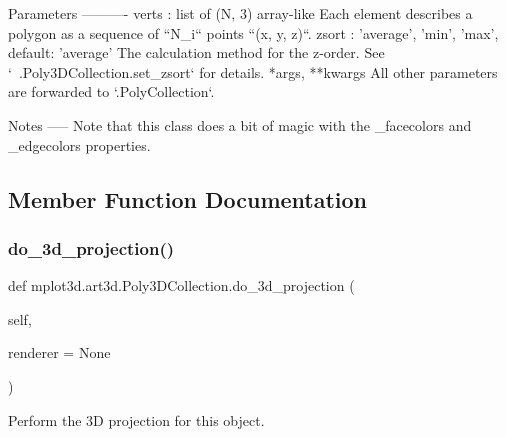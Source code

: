\begin{DoxyVerb}Parameters
----------
verts : list of (N, 3) array-like
    Each element describes a polygon as a sequence of ``N_i`` points
    ``(x, y, z)``.
zsort : {'average', 'min', 'max'}, default: 'average'
    The calculation method for the z-order.
    See `~.Poly3DCollection.set_zsort` for details.
*args, **kwargs
    All other parameters are forwarded to `.PolyCollection`.

Notes
-----
Note that this class does a bit of magic with the _facecolors
and _edgecolors properties.
\end{DoxyVerb}
 

\subsection{Member Function Documentation}
\mbox{\label{classmplot3d_1_1art3d_1_1Poly3DCollection_a15ea0337f78c6885b621ffff20748afd}} 
\subsubsection{\texorpdfstring{do\+\_\+3d\+\_\+projection()}{do\_3d\_projection()}}
{\footnotesize\ttfamily def mplot3d.\+art3d.\+Poly3\+D\+Collection.\+do\+\_\+3d\+\_\+projection (\begin{DoxyParamCaption}\item[{}]{self,  }\item[{}]{renderer = {\ttfamily None} }\end{DoxyParamCaption})}

\begin{DoxyVerb}Perform the 3D projection for this object.
\end{DoxyVerb}
 \mbox{\label{classmplot3d_1_1art3d_1_1Poly3DCollection_ac4741cb0e74c11c625d05a629f29d138}} 
